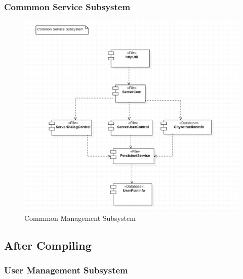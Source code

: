 \documentclass[10pt]{article}
\begin{document}
\subsubsection{Commmon Service Subsystem}
\begin{figure}[H]
    \centering
    
    \includegraphics[width=14cm]{commonbefore.png}
    \caption{Commmon Management Subsystem}
    \label{Commmon Management Subsystem}
\end{figure}

\subsection{After Compiling}
\subsubsection{User Management Subsystem}
\end{document}
